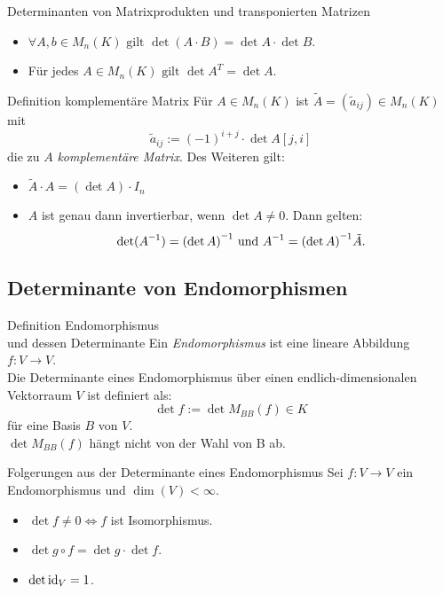 \documentclass[main.tex]{subfiles}
\begin{document}
\begin{karte}{Determinanten von Matrixprodukten und transponierten Matrizen}
    \begin{itemize}
        \item \(\forall A,b \in M_n(K) \text{ gilt } 
        \det(A \cdot B) = \det A \cdot \det B\).
        \item Für jedes \(A \in M_n(K) \text{ gilt } 
        \det A^T = \det A\).
    \end{itemize}
\end{karte}
\begin{karte}{Definition komplementäre Matrix}
    Für \(A \in M_n(K)\) ist \(\tilde{A} = (\tilde{a}_{ij}) \in M_n(K)\) mit
    \[\tilde{a}_{ij} := {(-1)}^{i+j} \cdot \det A[j,i]\]
    die zu \(A\) \textit{komplementäre Matrix}.
    Des Weiteren gilt:
    \begin{itemize}
        \item \(\tilde{A} \cdot A = (\det A) \cdot I_n\)
        \item \(A\) ist genau dann invertierbar, wenn \(\det A \neq 0\). Dann gelten: 
        \[\det(\inverse A) = \inverse{(\det A)} \text{ und }
         \inverse A = \inverse{(\det A)} \tilde{A}.\]
    \end{itemize}
\end{karte}

\subsection*{Determinante von Endomorphismen}

\begin{karte}{Definition Endomorphismus\\und dessen Determinante}
    Ein \textit{Endomorphismus} ist eine lineare Abbildung 
    \( f: V \rightarrow V \).\\
    Die Determinante eines Endomorphismus über einen endlich-dimensionalen 
    Vektorraum \(V\) ist definiert als:
    \[ \det f := \det M_{BB}(f) \in K \]
    für eine Basis \(B\) von \(V\).\\
    \(\det M_{BB}(f)\) hängt nicht von der Wahl von B ab. 
\end{karte}
\begin{karte}{Folgerungen aus der Determinante eines Endomorphismus}
    Sei \(f: V \rightarrow V\) ein Endomorphismus und \( \dim(V) < \infty \).
    \begin{itemize}
        \item \(\det f \neq 0 \Leftrightarrow f\) ist Isomorphismus.
        \item \(\det g \circ f = \det g \cdot \det f\).
        \item \(\det \operatorname{id}_V = 1\).
    \end{itemize}
\end{karte}
\end{document}
